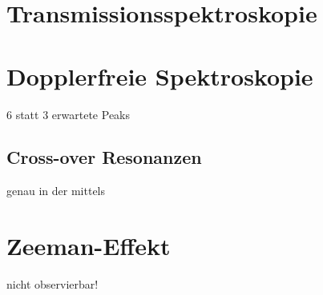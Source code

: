 \documentclass[../bericht.tex]{subfiles}
\begin{document}
    \section{Transmissionsspektroskopie}
    \label{sec:transmissionsspektroskopie}


    \section{Dopplerfreie Spektroskopie}
    \label{sec:dopplerfreie-spektroskopie}


      6 statt 3 erwartete Peaks


      \subsection{Cross-over Resonanzen}
      \label{subsec:cross-over-resonanzen}

        genau in der mittels


    \section{Zeeman-Effekt}
    \label{sec:zeeman-effekt}

      nicht observierbar!
\end{document}

